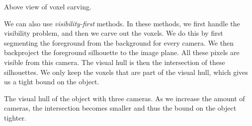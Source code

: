 \begin{marginfigure}
    \centering
    \caption{Above view of voxel carving.}
    \label{fig:voxel}
\end{marginfigure}

We can also use \textit{visibility-first} methods. In these methods, we first
handle the visibility problem, and then we carve out the voxels. We do this by
first segmenting the foreground from the background for every camera. We then
backproject the foreground silhouette to the image plane. All these pixels are
visible from this camera. The visual hull is then the intersection of these
silhouettes. We only keep the voxels that are part of the visual hull, which
gives us a tight bound on the object.

\begin{marginfigure}[0.5cm]
    \centering
    \caption{The visual hull of the object with three cameras. As we increase
      the amount of cameras, the intersection becomes smaller and thus the bound
      on the object tighter.}
    \label{fig:visual-hull}
\end{marginfigure}
